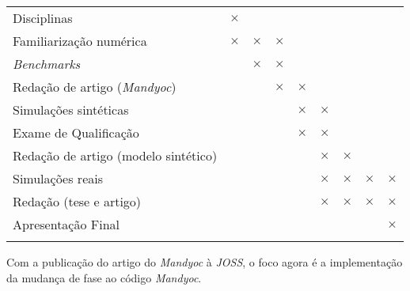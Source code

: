 \begin{center}
\begin{longtable}{lcccccccc}
		Disciplinas & 
            $\times$ & & & & & & & \\ 
		Familiarização numérica & 
			$\times$ & $\times$ & $\times$ & & & & & \\
		\textit{Benchmarks} &
            & $\times$ & $\times$ & & & & & \\
        Redação de artigo (\textit{Mandyoc}) &
            & & $\times$ & $\times$ & & & & \\
        Simulações sintéticas\footnotemark[1] &
			& & & $\times$ & $\times$ & & & \\
        Exame de Qualificação\footnotemark[2] & 
            & & & $\times$ & $\times$ & & & \\
		Redação de artigo (modelo sintético) & 
			& & & & $\times$ & $\times$ & & \\
		Simulações reais\footnotemark[3] & 
            & & & &  $\times$ & $\times$ & $\times$ & $\times$ \\
		Redação (tese e artigo) & 
			& & & & $\times$ &  $\times$ & $\times$ & $\times$ \\
		Apresentação Final & 
			& & & & & & & $\times$ \\
        
        \label{table:fixed-params}
    \end{longtable}
\end{center}


Com a publicação do artigo do \textit{Mandyoc} à \textit{JOSS}, o foco agora é a implementação da mudança de fase ao código \textit{Mandyoc}.


